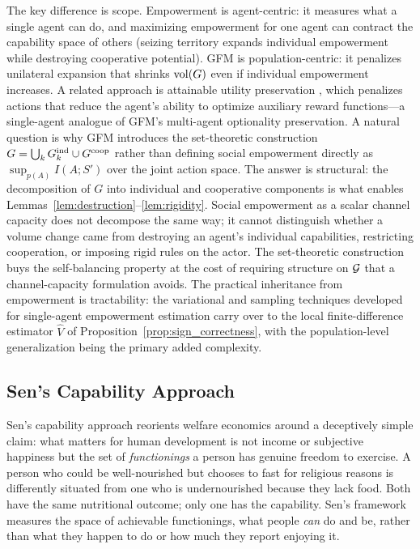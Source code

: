 The key difference is scope. Empowerment is agent-centric: it measures what a
single agent can do, and maximizing empowerment for one agent can contract the
capability space of others (seizing territory expands individual empowerment
while destroying cooperative potential). GFM is population-centric: it
penalizes unilateral expansion that shrinks $\operatorname{vol}(G)$ even if individual
empowerment increases. A related approach is attainable utility preservation
\citep{turner2020conservative}, which penalizes actions that reduce the agent's
ability to optimize auxiliary reward functions---a single-agent analogue of
GFM's multi-agent optionality preservation. A natural question is why GFM
introduces the set-theoretic construction $G = \bigcup_k G_{k}^{\mathrm{ind}} \cup G^{\mathrm{coop}}$
rather than defining social empowerment directly as $\sup_{p(A)} I(A; S')$ over
the joint action space. The answer is structural: the decomposition of $G$ into
individual and cooperative components is what enables
Lemmas~\ref{lem:destruction}--\ref{lem:rigidity}. Social empowerment as a
scalar channel capacity does not decompose the same way; it cannot distinguish
whether a volume change came from destroying an agent's individual
capabilities, restricting cooperation, or imposing rigid rules on the actor.
The set-theoretic construction buys the self-balancing property at the cost of
requiring structure on $\mathcal{G}$ that a channel-capacity formulation avoids. The
practical inheritance from empowerment is tractability: the variational and
sampling techniques developed for single-agent empowerment estimation carry
over to the local finite-difference estimator $\hat{V}$ of
Proposition~\ref{prop:sign_correctness}, with the population-level
generalization being the primary added complexity.

\subsection{Sen's Capability Approach}
\label{sec:connections_sen}

Sen's capability approach \citep{sen1999development} reorients welfare
economics around a deceptively simple claim: what matters for human development
is not income or subjective happiness but the set of \emph{functionings} a
person has genuine freedom to exercise. A person who could be well-nourished
but chooses to fast for religious reasons is differently situated from one who
is undernourished because they lack food. Both have the same nutritional
outcome; only one has the capability. Sen's framework measures the space of
achievable functionings, what people \emph{can} do and be, rather than what
they happen to do or how much they report enjoying it.

